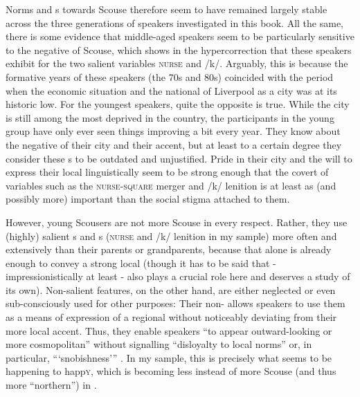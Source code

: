 Norms and s towards Scouse therefore seem to have remained largely stable across the three generations of speakers investigated in this book.
All the same, there is some evidence that middle-aged speakers seem to be particularly sensitive to the negative  of Scouse, which shows in the hypercorrection that these speakers exhibit for the two salient variables \textsc{nurse} and /k/.
Arguably, this is because the formative years of these speakers (the 70s and 80s) coincided with the period when the economic situation and the national  of Liverpool as a city was at its historic low.
For the youngest speakers, quite the opposite is true.
While the city is still among the most deprived in the country, the participants in the young group have only ever seen things improving a bit every year.
They know about the negative  of their city and their accent, but at least to a certain degree they consider these s to be outdated and unjustified.
Pride in their city and the will to express their local  linguistically seem to be strong enough that the covert  of variables such as the \textsc{nurse}-\textsc{square} merger and /k/ lenition is at least as (and possibly more) important than the social stigma attached to them.

However, young Scousers are not more Scouse in every respect.
Rather, they use (highly) salient s and s (\textsc{nurse} and /k/ lenition in my sample) more often and extensively than their parents or grandparents, because that alone is already enough to convey a strong local  (though it has to be said that  - impressionistically at least - also plays a crucial role here and deserves a study of its own).
Non-salient features, on the other hand, are either neglected or even sub-consciously used for other purposes: Their non- allows speakers to use them as a means of expression of a regional  without noticeably deviating from their more local accent.
Thus, they enable speakers ``to appear outward-looking or more cosmopolitan'' without signalling ``disloyalty to local norms'' or, in particular, ``{}`snobishness'{}'' \parencite[13--14]{foulkesdocherty1999a}.
In my sample, this is precisely what seems to be happening to happ\textsc{y}, which is becoming less instead of more Scouse (and thus more ``northern'') in .

